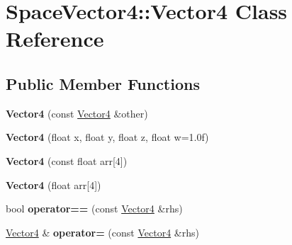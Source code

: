 \hypertarget{class_space_vector4_1_1_vector4}{}\section{Space\+Vector4\+:\+:Vector4 Class Reference}
\label{class_space_vector4_1_1_vector4}
\subsection*{Public Member Functions}
\begin{DoxyCompactItemize}
\item 
\mbox{\label{class_space_vector4_1_1_vector4_a2d74027a6cd18790d44a35e07be057bc}} 
{\bfseries Vector4} (const \mbox{\hyperlink{class_space_vector4_1_1_vector4}{Vector4}} \&other)
\item 
\mbox{\label{class_space_vector4_1_1_vector4_af1defc2c881b55f3095b6d32024cf0cd}} 
{\bfseries Vector4} (float x, float y, float z, float w=1.\+0f)
\item 
\mbox{\label{class_space_vector4_1_1_vector4_a9977965375a20112339df3b554312988}} 
{\bfseries Vector4} (const float arr\mbox{[}4\mbox{]})
\item 
\mbox{\label{class_space_vector4_1_1_vector4_a15181d0ac9fe25d8dac707c5cd4e44d6}} 
{\bfseries Vector4} (float arr\mbox{[}4\mbox{]})
\item 
\mbox{\label{class_space_vector4_1_1_vector4_a6724fb864b18b2d7e62327575deaa96d}} 
bool {\bfseries operator==} (const \mbox{\hyperlink{class_space_vector4_1_1_vector4}{Vector4}} \&rhs)
\item 
\mbox{\label{class_space_vector4_1_1_vector4_ac4f51027ef687a04d6aa10269fefda12}} 
\mbox{\hyperlink{class_space_vector4_1_1_vector4}{Vector4}} \& {\bfseries operator=} (const \mbox{\hyperlink{class_space_vector4_1_1_vector4}{Vector4}} \&rhs)
\item 
\mbox{\label{class_space_vector4_1_1_vector4_a9dccfd63d3647783c7736e61494bb88f}} 

\end{DoxyCompactItemize}
